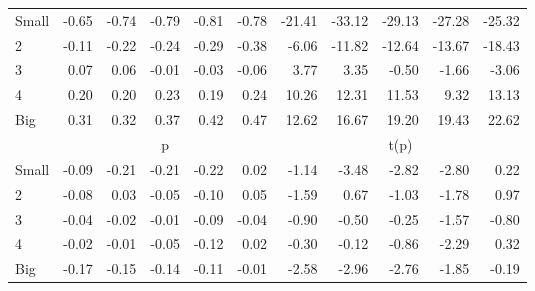 \begin{table}[!ht]
\begin{tabular}{lrrrrrrrrrr}
    \\
      \cmidrule(r){2-6} \cmidrule(r){7-11}

    Small   & -0.65  & -0.74  & -0.79  & -0.81  & -0.78  & -21.41  & -33.12  & -29.13  & -27.28  & -25.32  \\
         2  & -0.11  & -0.22  & -0.24  & -0.29  & -0.38  & -6.06  & -11.82  & -12.64  & -13.67  & -18.43  \\
         3  & 0.07  & 0.06  & -0.01  & -0.03  & -0.06  & 3.77  & 3.35  & -0.50  & -1.66  & -3.06  \\
         4  & 0.20  & 0.20  & 0.23  & 0.19  & 0.24  & 10.26  & 12.31  & 11.53  & 9.32  & 13.13  \\
    Big     & 0.31  & 0.32  & 0.37  & 0.42  & 0.47  & 12.62  & 16.67  & 19.20  & 19.43  & 22.62  \\

  
    
      & \multicolumn{5}{c}{p} & \multicolumn{5}{c}{t(p)}
    
    \\
      \cmidrule(r){2-6} \cmidrule(r){7-11}

    Small   & -0.09  & -0.21  & -0.21  & -0.22  & 0.02  & -1.14  & -3.48  & -2.82  & -2.80  & 0.22  \\
         2  & -0.08  & 0.03  & -0.05  & -0.10  & 0.05  & -1.59  & 0.67  & -1.03  & -1.78  & 0.97  \\
         3  & -0.04  & -0.02  & -0.01  & -0.09  & -0.04  & -0.90  & -0.50  & -0.25  & -1.57  & -0.80  \\
         4  & -0.02  & -0.01  & -0.05  & -0.12  & 0.02  & -0.30  & -0.12  & -0.86  & -2.29  & 0.32  \\
    Big     & -0.17  & -0.15  & -0.14  & -0.11  & -0.01  & -2.58  & -2.96  & -2.76  & -1.85  & -0.19  \\

  

  \bottomrule
\end{tabular}
\label{tbl:25_Size_Prior_B2016}
\end{table}